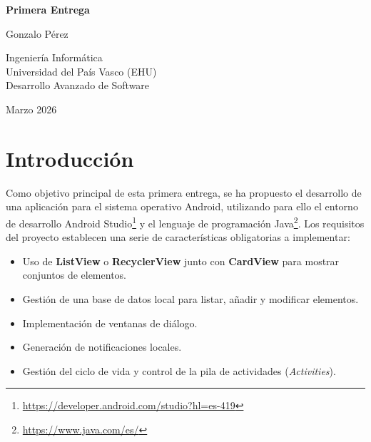 \documentclass{article}
\begin{document}
\begin{titlepage}
    \centering
    \vspace*{2cm}

    {\Huge \bfseries Primera Entrega\par}
    \vspace{1.5cm}

    {\Large Gonzalo Pérez\par}
    \vspace{1cm}

    {\large Ingeniería Informática\\
        Universidad del País Vasco (EHU) \\
        Desarrollo Avanzado de Software\par}
    \vspace{2cm}

    {\large Marzo 2026\par}

    \vfill
\end{titlepage}


\tableofcontents
\newpage


\section{Introducción}

Como objetivo principal de esta primera entrega, se ha propuesto el desarrollo de una aplicación para el sistema operativo Android, utilizando para ello el entorno de desarrollo Android Studio\footnote{\url{https://developer.android.com/studio?hl=es-419}} y el lenguaje de programación Java\footnote{\url{https://www.java.com/es/}}. Los requisitos del proyecto establecen una serie de características obligatorias a implementar:

\begin{itemize}
    \item Uso de \textbf{ListView} o \textbf{RecyclerView} junto con \textbf{CardView} para mostrar conjuntos de elementos.
    \item Gestión de una base de datos local para listar, añadir y modificar elementos.
    \item Implementación de ventanas de diálogo.
    \item Generación de notificaciones locales.
    \item Gestión del ciclo de vida y control de la pila de actividades (\textit{Activities}).
\end{itemize}
\end{document}
